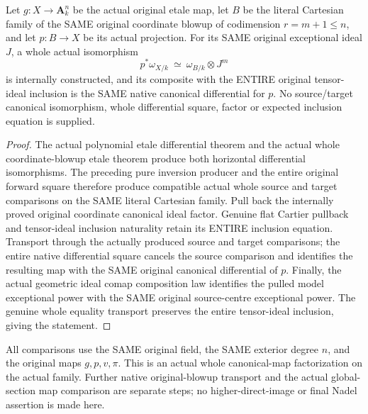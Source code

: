 \begin{theorem}
\label{thm:kn-blowup-canonical-etale-ideal-factor}
\leanok
{}
Let $g:X\to\mathbf A_k^n$ be the actual original etale map, let $B$ be the literal Cartesian family of the SAME original coordinate blowup of codimension $r=m+1\leq n$, and let $p:B\to X$ be its actual projection. For its SAME original exceptional ideal $J$, a whole actual isomorphism
\[p^*\omega_{X/k}\ \simeq\ \omega_{B/k}\otimes J^m\]
is internally constructed, and its composite with the ENTIRE original tensor-ideal inclusion is the SAME native canonical differential for $p$. No source/target canonical isomorphism, whole differential square, factor or expected inclusion equation is supplied.
\end{theorem}
\begin{proof}
The actual polynomial etale differential theorem and the actual whole coordinate-blowup etale theorem produce both horizontal differential isomorphisms. The preceding pure inversion producer and the entire original forward square therefore produce compatible actual whole source and target comparisons on the SAME literal Cartesian family. Pull back the internally proved original coordinate canonical ideal factor. Genuine flat Cartier pullback and tensor-ideal inclusion naturality retain its ENTIRE inclusion equation. Transport through the actually produced source and target comparisons; the entire native differential square cancels the source comparison and identifies the resulting map with the SAME original canonical differential of $p$. Finally, the actual geometric ideal comap composition law identifies the pulled model exceptional power with the SAME original source-centre exceptional power. The genuine whole equality transport preserves the entire tensor-ideal inclusion, giving the statement.
\end{proof}

\begin{remark}
All comparisons use the SAME original field, the SAME exterior degree $n$, and the original maps $g,p,v,\pi$. This is an actual whole canonical-map factorization on the actual family. Further native original-blowup transport and the actual global-section map comparison are separate steps; no higher-direct-image or final Nadel assertion is made here.
\end{remark}
